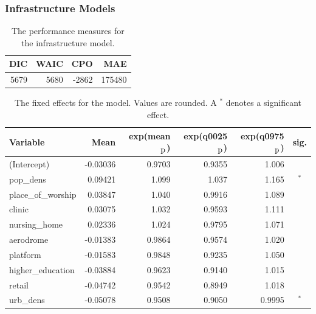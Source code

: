 \subsubsection{Infrastructure Models}
\begin{table}[H] 
\caption{The performance measures for the infrastructure model. \label{infraGermany_nospatial}}
\begin{tabular}{r r r r}
\toprule\textbf{DIC}	& \textbf{WAIC} & \textbf{CPO} & \textbf{MAE}\\
\midrule
5679 & 5680 & -2862 & 175480 \\
\bottomrule
\end{tabular}
\end{table}
\begin{table}[H]
\caption{The fixed effects for the model. Values are rounded. A $^*$ denotes a significant effect. \label{FixedInfraGermany_nospatial}}
\begin{tabular}{l r r r r c}
\toprule
\textbf{Variable}	& \textbf{Mean}	& \textbf{exp(mean$_{\hbox{p}}$)} & \textbf{exp(q0025$_{\hbox{p}}$)} & \textbf{exp(q0975$_{\hbox{p}}$)} & \textbf{sig.}\\
\midrule
(Intercept) & -0.03036 & 0.9703 & 0.9355 & 1.006 & \\
pop\_dens & 0.09421 & 1.099 & 1.037 & 1.165 & $^*$\\
place\_of\_worship & 0.03847 & 1.040 & 0.9916 & 1.089\\
clinic & 0.03075 & 1.032 & 0.9593 & 1.111  \\
nursing\_home & 0.02336 & 1.024 & 0.9795 & 1.071 \\
aerodrome & -0.01383 & 0.9864 & 0.9574 & 1.020 \\
platform & -0.01583 & 0.9848 & 0.9235 & 1.050 \\
higher\_education & -0.03884 & 0.9623 & 0.9140 & 1.015 \\
retail & -0.04742 & 0.9542 & 0.8949 & 1.018 \\
urb\_dens & -0.05078 & 0.9508 & 0.9050 & 0.9995 & $^*$\\
\bottomrule
\end{tabular}
\end{table}
